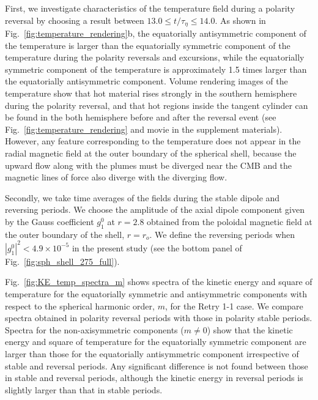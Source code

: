 First, we investigate characteristics of the temperature field during a polarity reversal by choosing a result between $13.0 \le t/\tau_{\eta} \le 14.0$. 
As shown in Fig.~\ref{fig:temperature_rendering}b, the equatorially antisymmetric component of the temperature is larger than the equatorially symmetric component of the temperature during the polarity reversals and excursions, while the equatorially symmetric component of the temperature is approximately 1.5 times larger than the equatorially antisymmetric component. 
Volume rendering images of the temperature show that hot material rises strongly in the southern hemisphere during the polarity reversal, and that hot regions inside the tangent cylinder can be found in the both hemisphere before and after the reversal event
(see Fig.~\ref{fig:temperature_rendering} and movie in the supplement materials). 
However, any feature corresponding to the temperature does not appear in the radial magnetic field at the outer boundary of the spherical shell, 
because the upward flow along with the plumes must be diverged near the CMB and the magnetic lines of force also diverge with the diverging flow.

Secondly, we take time averages of the fields during the stable dipole and reversing periods. 
We choose the amplitude of the axial dipole component given by the Gauss coefficient $g_{1}^{0}$ at $r = 2.8$ obtained from the poloidal magnetic field at the outer boundary of the shell, $r = r_{o}$. 
We define the reversing periods when $\left| g_{1}^{0} \right|^2 < 4.9 \times 10^{-5}$ in the present study (see the bottom panel of Fig.~\ref{fig:sph_shell_275_full}). 


% 


Fig.~\ref{fig:KE_temp_spectra_m} shows spectra of the kinetic energy and square of temperature for the equatorially symmetric and antisymmetric components
with respect to the spherical harmonic order, $m$, for the Retry 1-1 case.
We compare spectra obtained in polarity reversal periods with those in polarity stable periods.
Spectra for the non-axisymmetric components ($m \ne 0$) show that the kinetic energy and square of temperature for the equatorially symmetric component are larger than those for the equatorially antisymmetric component irrespective of stable and reversal periods.
Any significant difference is not found between those in stable and reversal periods, although the kinetic energy in reversal periods is slightly larger than that in stable periods.

